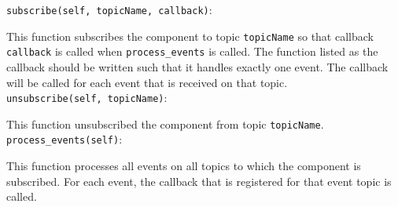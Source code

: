 \texttt{subscribe(self, topicName, callback)}:
\par
  This function subscribes the component to topic \texttt{topicName} so that 
  callback \texttt{callback} is called when \texttt{process\_events} is called.  The 
  function listed as the callback should be written such that it handles 
  exactly one event.  The callback will be called for each event that is 
  received on that topic.\\


\texttt{unsubscribe(self, topicName)}:
\par
  This function unsubscribed the component from topic \texttt{topicName}.\\

\texttt{process\_events(self)}:
\par
  This function processes all events on all topics to which the component 
  is subscribed.  For each event, the callback that is registered for that 
  event topic is called.
